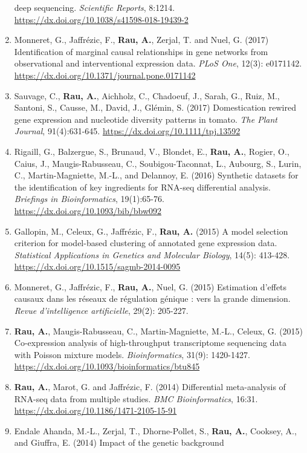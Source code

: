 \documentclass[11pt, a4paper]{awesome-cv}
\begin{document}
\begin{enumerate}
  deep sequencing. \emph{Scientific Reports}, 8:1214.
  \url{https://dx.doi.org/10.1038/s41598-018-19439-2}
\item
  Monneret, G., Jaffrézic, F., \textbf{Rau, A.}, Zerjal, T. and Nuel, G.
  (2017) Identification of marginal causal relationships in gene
  networks from observational and interventional expression data.
  \emph{PLoS One}, 12(3): e0171142.
  \url{https://dx.doi.org/10.1371/journal.pone.0171142}
\item
  Sauvage, C., \textbf{Rau, A.}, Aichholz, C., Chadoeuf, J., Sarah, G.,
  Ruiz, M., Santoni, S., Causse, M., David, J., Glémin, S. (2017)
  Domestication rewired gene expression and nucleotide diversity
  patterns in tomato. \emph{The Plant Journal}, 91(4):631-645.
  \url{https://dx.doi.org/10.1111/tpj.13592}
\item
  Rigaill, G., Balzergue, S., Brunaud, V., Blondet, E., \textbf{Rau,
  A.}, Rogier, O., Caius, J., Maugis-Rabusseau, C., Soubigou-Taconnat,
  L., Aubourg, S., Lurin, C., Martin-Magniette, M.-L., and Delannoy, E.
  (2016) Synthetic datasets for the identification of key ingredients
  for RNA-seq differential analysis. \emph{Briefings in Bioinformatics},
  19(1):65-76. \url{https://dx.doi.org/10.1093/bib/bbw092}
\item
  Gallopin, M., Celeux, G., Jaffrézic, F., \textbf{Rau, A.} (2015) A
  model selection criterion for model-based clustering of annotated gene
  expression data. \emph{Statistical Applications in Genetics and
  Molecular Biology}, 14(5): 413-428.
  \url{https://dx.doi.org/10.1515/sagmb-2014-0095}
\item
  Monneret, G., Jaffrézic, F., \textbf{Rau, A.}, Nuel, G. (2015)
  Estimation d'effets causaux dans les réseaux de régulation génique :
  vers la grande dimension. \emph{Revue d'intelligence artificielle},
  29(2): 205-227.
\item
  \textbf{Rau, A.}, Maugis-Rabusseau, C., Martin-Magniette, M.-L.,
  Celeux, G. (2015) Co-expression analysis of high-throughput
  transcriptome sequencing data with Poisson mixture models.
  \emph{Bioinformatics}, 31(9): 1420-1427.
  \url{https://dx.doi.org/10.1093/bioinformatics/btu845}
\item
  \textbf{Rau, A.}, Marot, G. and Jaffrézic, F. (2014) Differential
  meta-analysis of RNA-seq data from multiple studies. \emph{BMC
  Bioinformatics}, 16:31.
  \url{https://dx.doi.org/10.1186/1471-2105-15-91}
\item
  Endale Ahanda, M.-L., Zerjal, T., Dhorne-Pollet, S., \textbf{Rau, A.},
  Cooksey, A., and Giuffra, E. (2014) Impact of the genetic background

\end{enumerate}
\end{document}
